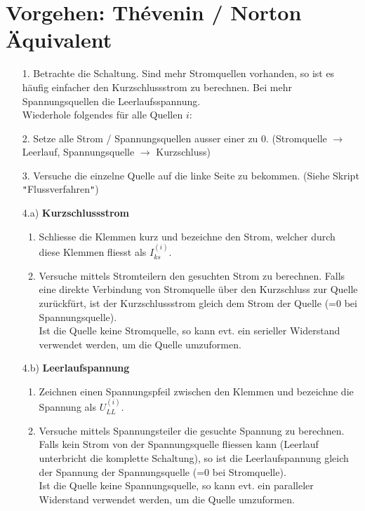 \section{Vorgehen: Thévenin / Norton Äquivalent}

\begin{itemize}

  \item[1.] Betrachte die Schaltung. Sind mehr Stromquellen vorhanden, so ist es häufig einfacher den Kurzschlussstrom zu berechnen. Bei mehr Spannungsquellen die Leerlaufsspannung. \\
  Wiederhole folgendes für alle Quellen $i$:

  \end{itemize}
  \beginip
  \begin{itemize}

  \item [2.  ]  Setze alle Strom / Spannungsquellen ausser einer zu 0. (Stromquelle $\rightarrow$ Leerlauf, Spannungsquelle $\rightarrow$ Kurzschluss)
  \item[3. ] Versuche die einzelne Quelle auf die linke Seite zu bekommen. (Siehe Skript \texttt{"}Flussverfahren\texttt{"})
  \item[4.a)] \textbf{Kurzschlussstrom}
  \begin{enumerate}
  \item Schliesse die Klemmen kurz und bezeichne den Strom, welcher durch diese Klemmen fliesst als $I_{ks}^{(i)}$.
  \item Versuche mittels Stromteilern den gesuchten Strom zu berechnen. Falls eine direkte Verbindung von Stromquelle über den Kurzschluss zur Quelle zurückfürt, ist der Kurzschlussstrom gleich dem Strom der Quelle (=0 bei Spannungsquelle). \\
  Ist die Quelle keine Stromquelle, so kann evt. ein serieller Widerstand verwendet werden, um die Quelle umzuformen.
  \end{enumerate}
  \item[4.b)] \textbf{Leerlaufspannung}
  \begin{enumerate}
  \item Zeichnen einen Spannungspfeil zwischen den Klemmen und bezeichne die Spannung als $U_{LL}^{(i)}$.
  \item Versuche mittels Spannungsteiler die gesuchte Spannung zu berechnen. Falls kein Strom von der Spannungsquelle fliessen kann (Leerlauf unterbricht die komplette Schaltung), so ist die Leerlaufspannung gleich der Spannung der Spannungsquelle (=0 bei Stromquelle). \\
  Ist die Quelle keine Spannungsquelle, so kann evt. ein paralleler Widerstand verwendet werden, um die Quelle umzuformen.
  \end{enumerate}
\end{itemize}

